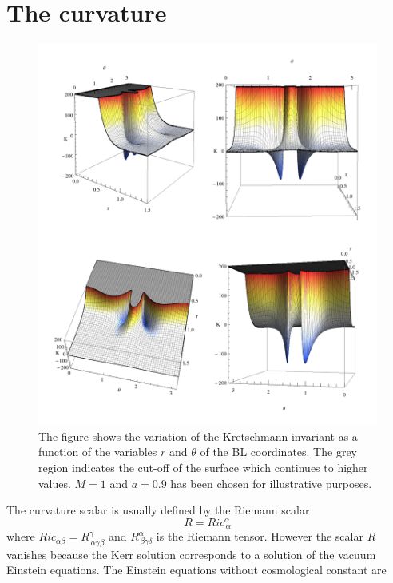 \section{The curvature}
  \begin{figure}[htp!]  
\begin{center}
 \centerline{\includegraphics[width=1\textwidth]{img/Chapter0/Kresch.png}}
 \end{center}
 \vspace{-1.5cm}
 \caption{The figure shows the variation of the Kretschmann invariant as a function of the variables $r$ and $\theta$ of the \gls{BL} coordinates. The grey region indicates  the cut-off of the surface which continues to higher values. $M=1$ and $a=0.9$ has been chosen for illustrative purposes.}
 \label{fig:Kresch}
\end{figure} 
The curvature scalar is usually defined by the Riemann scalar
\begin{equation}
 R=Ric^{\alpha}_{\,\alpha}
\end{equation}
where $Ric_{\alpha \beta}=R^\gamma_{\,\alpha \gamma \beta}$ and $R^{\alpha}_{\,\beta \gamma \delta}$ is the Riemann tensor. However the scalar $R$ vanishes because the Kerr solution corresponds to a solution of the vacuum Einstein equations. The Einstein equations without cosmological constant are
